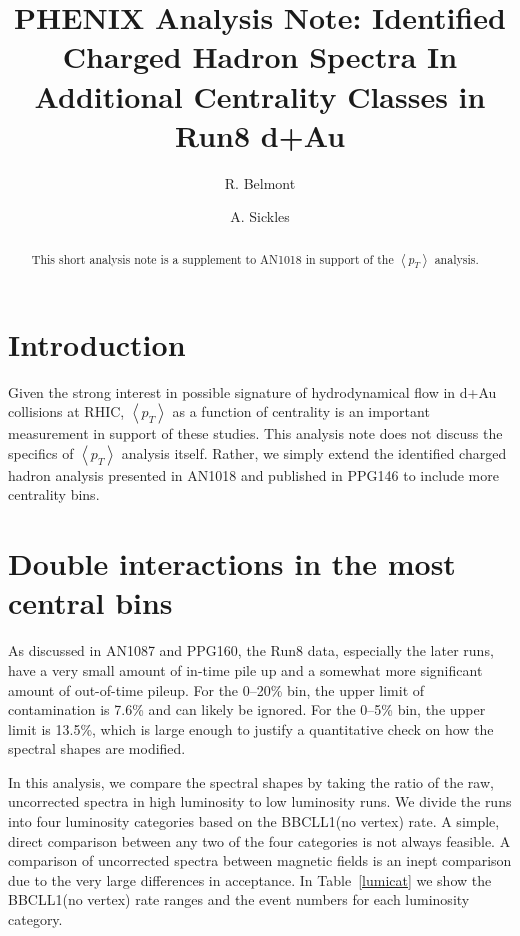 \documentclass[10pt]{article}
\begin{document}
\title{PHENIX Analysis Note: Identified Charged Hadron Spectra In Additional Centrality Classes in Run8 d+Au}
\author[1]{R. Belmont}
\author[2]{A. Sickles}
\maketitle


\begin{abstract}
This short analysis note is a supplement to AN1018 in support of the $\left<p_T\right>$
analysis.
\end{abstract}

\newpage

\tableofcontents

\newpage


\section{Introduction}

Given the strong interest in possible signature of hydrodynamical flow in d+Au
collisions at RHIC, $\left<p_T\right>$ as a function of centrality is an important
measurement in support of these studies.  This analysis note does not discuss
the specifics of $\left<p_T\right>$ analysis itself.  Rather, we simply extend
the identified charged hadron analysis presented in AN1018 and published in PPG146
to include more centrality bins.

\section{Double interactions in the most central bins}

As discussed in AN1087 and PPG160, the Run8 data, especially the later runs,
have a very small amount of in-time pile up and a somewhat more significant
amount of out-of-time pileup.  For the 0--20\% bin, the upper limit of
contamination is 7.6\% and can likely be ignored.  For the 0--5\% bin,
the upper limit is 13.5\%, which is large enough to justify a quantitative
check on how the spectral shapes are modified.

In this analysis, we compare the spectral shapes by taking the ratio of the
raw, uncorrected spectra in high luminosity to low luminosity runs.  We divide
the runs into four luminosity categories based on the BBCLL1(no vertex) rate.
A simple, direct comparison between any two of the four categories is not
always feasible.
A comparison of uncorrected spectra between magnetic fields is an inept
comparison due to the very large differences in acceptance.
In Table~\ref{lumicat} we show the BBCLL1(no vertex) rate ranges and the
event numbers for each luminosity category.
\end{document}
